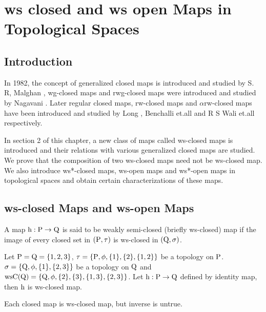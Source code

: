 \chapter{ws closed and ws open Maps in Topological Spaces}
\graphicspath{{Chapter4/Chapter4Figs/EPS/}{Chapter4/Chapter4Figs/}}

\section{Introduction}\label{sec4.1}

In 1982, the concept of generalized closed maps is introduced and studied by S. R, Malghan \cite{Malghan}, wg-closed maps and rwg-closed maps were introduced and studied by Nagavani \cite{Nagaveni}. Later regular closed maps, rw-closed maps and $\alpha$rw-closed maps have been introduced and studied by Long \cite{Long}, Benchalli et.all \cite{Benchalli} and R S Wali et.all \cite{Wali4} respectively. 

In section 2 of this chapter, a new class of maps called ws-closed maps is introduced and their relations with various generalized closed maps are studied. We prove that the composition of two ws-closed maps need not be ws-closed map. We also introduce ws*-closed maps, ws-open maps and ws*-open maps in topological spaces and obtain certain characterizations of these maps.

\section{ws-closed Maps and ws-open Maps}\label{sec4.2}

\begin{dfn}\label{defi4.2.1} 
A map $\mathrm{h}: \mathrm{P} \to \mathrm{Q}$ is said to be weakly semi-closed (briefly ws-closed) map if the image of every closed set in $(\mathrm{P}, \tau)$ is ws-closed in $(\mathrm{Q}, \sigma)$.
\end{dfn}

\begin{exm}\label{exam4.2.2}
Let $\mathrm{P} = \mathrm{Q} = \{1, 2, 3\}$, $\tau = \{\mathrm{P}, \phi, \{1\}, \{2\}, \{1, 2\}\}$ be a topology on $\mathrm{P}$.
$\sigma = \{\mathrm{Q}, \phi, \{1\}, \{2, 3\}\}$ be a topology on $\mathrm{Q}$ and $\ws\TSC(\TSQ) =\{\TSQ, \phi, \{2\},\{3\},\{1,3\},\break \{2, 3\}\}$. Let $\mathrm{h}: \mathrm{P} \to \mathrm{Q}$ defined by identity map, then $\mathrm{h}$ is ws-closed map.
\end{exm}

\begin{thm}\label{thm4.2.3}
Each closed map is ws-closed map, but inverse is untrue.
\end{thm}

